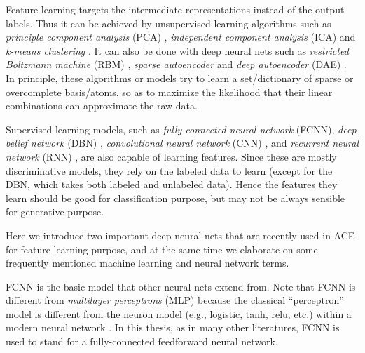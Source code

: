 Feature learning targets the intermediate representations instead of the output labels. Thus it can be achieved by unsupervised learning algorithms such as {\it principle component analysis} (PCA) \cite{jolliffe2002principal}, {\it independent component analysis} (ICA) \cite{hyvarinen2004independent} and {\it k-means clustering} \cite{macqueen1967some}. It can also be done with deep neural nets such as {\it restricted Boltzmann machine} (RBM) \cite{hinton2006fast}, \textit{sparse autoencoder} \cite{ng2011sparse} and {\it deep autoencoder} (DAE) \cite{bengio2009learning}. In principle, these algorithms or models try to learn a set/dictionary of sparse or overcomplete basis/atoms, so as to maximize the likelihood that their linear combinations can approximate the raw data.


Supervised learning models, such as {\it fully-connected neural network} (FCNN), {\it deep belief network} (DBN) \cite{hinton2006fast}, \textit{convolutional neural network} (CNN) \cite{lecun1995convolutional}, and {\it recurrent neural network} (RNN) \cite{elman1990finding}, are also capable of learning features. Since these are mostly discriminative models, they rely on the labeled data to learn (except for the DBN, which takes both labeled and unlabeled data). Hence the features they learn should be good for classification purpose, but may not be always sensible for generative purpose.

Here we introduce two important deep neural nets that are recently used in ACE for feature learning purpose, and at the same time we elaborate on some frequently mentioned machine learning and neural network terms.

FCNN is the basic model that other neural nets extend from. Note that FCNN is different from \textit{multilayer perceptrons} (MLP) because the classical ``perceptron'' model \cite{rosenblatt1958perceptron} is different from the neuron model (e.g., logistic, tanh, relu, etc.) within a modern neural network \cite{rumelhart1988parallel}. In this thesis, as in many other literatures, FCNN is used to stand for a fully-connected feedforward neural network.

